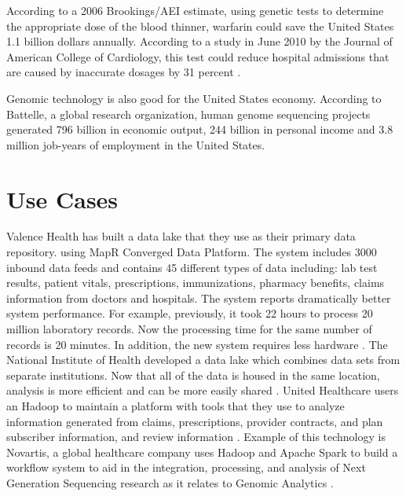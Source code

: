 \documentclass[sigconf]{acmart}
\begin{document}
{According to a 2006 Brookings/AEI estimate, using genetic tests to determine the appropriate dose of the blood thinner, warfarin could save the United States 1.1 billion dollars annually.  According to a study in June 2010 by the Journal of American College of Cardiology, this test could reduce hospital admissions that are caused by inaccurate dosages by 31 percent \cite{www-google-geno}.

Genomic technology is also good for the United States economy. According to Battelle, a global research organization, human genome sequencing projects generated 796 billion in economic output, 244 billion in personal income and 3.8 million job-years of employment in the United States. 

 \section{Use Cases}
Valence Health has built a data lake that they use as their primary data repository. using MapR Converged Data Platform. The system includes 3000 inbound data feeds and contains 45 different types of data including:  lab test results, patient vitals, prescriptions, immunizations, pharmacy benefits, claims information from doctors and hospitals. The system reports dramatically better system performance. For example, previously, it took 22 hours to process 20 million laboratory records. Now the processing time for the same number of records is 20 minutes. In addition, the new system requires less hardware \cite{www-google-McDonald}. 
The National Institute of Health developed a data lake which combines data sets from separate institutions. Now that all of the data is housed in the same location, analysis is more efficient and can be more easily shared \cite{www-google-McDonald}.
United Healthcare users an Hadoop to maintain a platform with tools that they use to analyze information generated from claims, prescriptions, provider contracts, and plan subscriber information, and review information \cite{www-google-McDonald}.
Example of this technology is Novartis, a global healthcare company uses Hadoop and Apache Spark to build a workflow system to aid in the integration, processing, and analysis of Next Generation Sequencing research as it relates to Genomic Analytics \cite{www-google-McDonald}.


}
\end{document}
